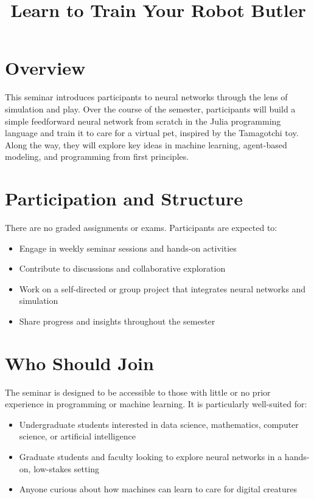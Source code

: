 \documentclass[10pt]{book}
\title{Learn to Train Your Robot Butler}
\begin{document}
\maketitle

\section{Overview}

This seminar introduces participants to neural networks through the lens of simulation and play. Over the course of the semester, participants will build a simple feedforward neural network from scratch in the Julia programming language and train it to care for a virtual pet, inspired by the Tamagotchi toy. Along the way, they will explore key ideas in machine learning, agent-based modeling, and programming from first principles.

\section{Participation and Structure}

There are no graded assignments or exams. Participants are expected to:
\begin{itemize}[itemsep=1ex]
    \item Engage in weekly seminar sessions and hands-on activities
    \item Contribute to discussions and collaborative exploration
    \item Work on a self-directed or group project that integrates neural networks and simulation
    \item Share progress and insights throughout the semester
\end{itemize}

\section{Who Should Join}

The seminar is designed to be accessible to those with little or no prior experience in programming or machine learning. It is particularly well-suited for:
\begin{itemize}[itemsep=1ex]
    \item Undergraduate students interested in data science, mathematics, computer science, or artificial intelligence
    \item Graduate students and faculty looking to explore neural networks in a hands-on, low-stakes setting
    \item Anyone curious about how machines can learn to care for digital creatures
\end{itemize}
\end{document}
